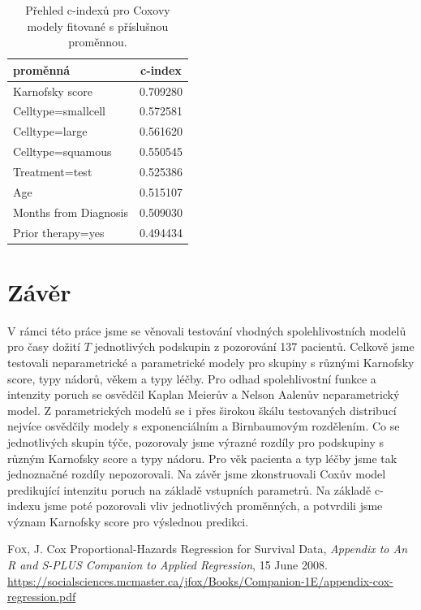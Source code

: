 \documentclass[10pt]{article}
\begin{document}
\begin{table}[htb!]
\centering
\begin{tabular}{lc}
proměnná & c-index \\ 
 \toprule
Karnofsky score       &   0.709280 \\
Celltype=smallcell    &   0.572581 \\
Celltype=large        &   0.561620 \\
Celltype=squamous     &   0.550545 \\
Treatment=test        &   0.525386 \\
Age          &   0.515107 \\
Months from Diagnosis &   0.509030 \\
Prior therapy=yes     &   0.494434 
\end{tabular}
\caption{Přehled c-indexů pro Coxovy modely fitované s příslušnou proměnnou.}\label{tab:asdasd}
\end{table}


\section{Závěr}

V rámci této práce jsme se věnovali testování vhodných spolehlivostních modelů pro časy dožití $T$ jednotlivých podskupin z pozorování 137 pacientů. Celkově jsme testovali neparametrické a parametrické modely pro skupiny s různými Karnofsky score, typy nádorů, věkem a typy léčby. Pro odhad spolehlivostní funkce a intenzity poruch se osvědčil Kaplan Meierův a Nelson Aalenův neparametrický model. Z parametrických modelů se i přes širokou škálu testovaných distribucí nejvíce osvědčily modely s exponenciálním a Birnbaumovým rozdělením. Co se jednotlivých skupin týče, pozorovaly jsme výrazné rozdíly pro podskupiny s různým Karnofsky score a typy nádoru. Pro věk pacienta a typ léčby jsme tak jednoznačné rozdíly nepozorovali. Na závěr jsme zkonstruovali Coxův model predikující intenzitu poruch na základě vstupních parametrů. Na základě c-indexu jsme poté pozorovali vliv jednotlivých proměnných, a potvrdili jsme význam Karnofsky score pro výslednou predikci.  





\begin{thebibliography}{9}
\textsc{Fox}, J. Cox Proportional-Hazards Regression for Survival Data, \emph{Appendix to An R and S-PLUS Companion to Applied Regression}, 15 June 2008. \url{https://socialsciences.mcmaster.ca/jfox/Books/Companion-1E/appendix-cox-regression.pdf}

\end{thebibliography}
\end{document}
